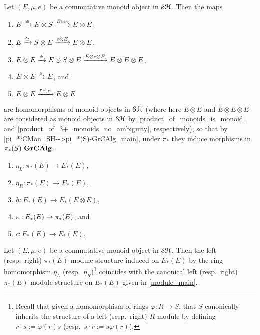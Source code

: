 \documentclass[../main.tex]{subfiles}
\begin{document}
\begin{proposition}\label{structure_maps_are_monoid_homos_main}
    Let $(E,\mu,e)$ be a commutative monoid object in $\mathcal{SH}$. Then the maps\begin{enumerate}
        \item $E\xrightarrow\cong E\otimes S\xrightarrow{E\otimes e}E\otimes E$,
        \item $E\xrightarrow\cong S\otimes E\xrightarrow{e\otimes E}E\otimes E$,
        \item $E\otimes E\xrightarrow\cong E\otimes S\otimes E\xrightarrow{E\otimes e\otimes E}E\otimes E\otimes E$,
        \item $E\otimes E\xrightarrow\mu E$, and
        \item $E\otimes E\xrightarrow{\tau_{E,E}}E\otimes E$
    \end{enumerate}
    are homomorphisms of monoid objects in $\mathcal{SH}$ (where here $E\otimes E$ and $E\otimes E\otimes E$ are considered as monoid objects in $\mathcal{SH}$ by \autoref{product_of_monoids_is_monoid} and \autoref{product_of_3+_monoids_no_ambiguity}, respectively), so that by \autoref{pi_*:CMon_SH-->pi_*(S)-GrCAlg_main}, under $\pi_*$ they induce morphisms in ${\pi_*(S)}\text-\mathbf{GrCAlg}$:
    \begin{enumerate}
        \item $\eta_L:\pi_*(E)\to E_*(E)$,
        \item $\eta_R:\pi_*(E)\to E_*(E)$,
        \item $h:E_*(E)\to E_*(E\otimes E)$,
        \item $\varepsilon:E_*(E)\to \pi_*(E)$, and
        \item $c:E_*(E)\to E_*(E)$.
    \end{enumerate}
\end{proposition}

\begin{lemma}\label{eta_L_left_module/eta_R_right_module_coincide}
    Let $(E,\mu,e)$ be a commutative monoid object in $\mathcal{SH}$. Then the left (resp.\ right) $\pi_*(E)$-module structure induced on $E_*(E)$ by the ring homomorphism $\eta_L$ (resp.\ $\eta_R$)\footnote{Recall that given a homomorphism of rings $\varphi:R\to S$, that $S$ canonically inherits the structure of a left (resp.\ right) $R$-module by defining $r\cdot s:=\varphi(r)s$ (resp.\ $s\cdot r:=s\varphi(r)$).} coincides with the canonical left (resp.\ right) $\pi_*(E)$-module structure on $E_*(E)$ given in \autoref{module_main}.
\end{lemma}
\end{document}
